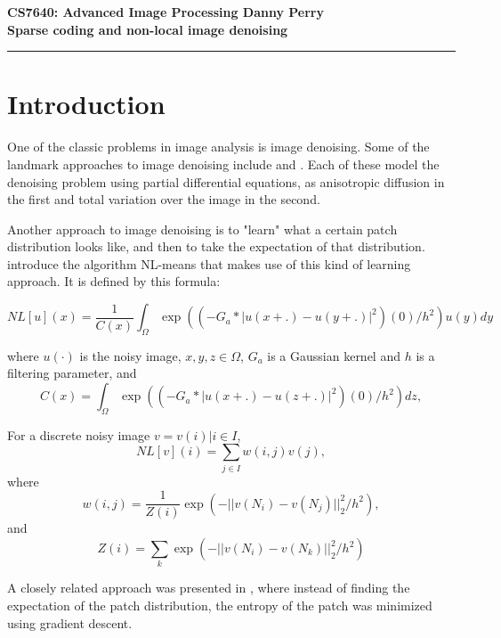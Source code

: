 \documentclass[11pt]{article}
\begin{document}
\thispagestyle{empty}
{\large{\bf CS7640: Advanced Image Processing \hfill Danny Perry}}\\

{\LARGE{\bf Sparse coding and non-local image denoising}}
\vspace{0.2\baselineskip}
\hrule

\section{Introduction}
One of the classic problems in image analysis is image denoising.
Some of the landmark approaches to image denoising include \cite{perona1990scale} and \cite{rudin1992nonlinear}.
Each of these model the denoising problem using partial differential equations, as anisotropic diffusion in the first and total variation over the image in the second. 

Another approach to image denoising is to "learn" what a certain patch distribution looks like, and then to take the expectation of that distribution.
\cite{buades2005non} introduce the algorithm NL-means that makes use of this kind of learning approach.
It is defined by this formula:

\begin{equation}
NL[u](x) = \frac{1}{C(x)} \int_{\Omega} \exp( (-G_a*|u(x+.)-u(y+.)|^2)(0) / h^2 ) u(y) dy
\end{equation}

where $u(\cdot)$ is the noisy image, $x,y,z\in \Omega$, $G_a$ is a Gaussian kernel and $h$ is a filtering parameter, and 
\begin{equation*}
C(x) = \int_{\Omega} \exp( (-G_a*|u(x+.)-u(z+.)|^2)(0) / h^2 ) dz,
\end{equation*}

For a discrete noisy image $v = {v(i) | i \in I}$,
\begin{equation}
NL[v](i) = \sum_{j \in I} w(i,j) v(j),
\end{equation}
where
\begin{equation*}
w(i,j) = \frac{1}{Z(i)} \exp( -||v(N_i)-v(N_j)||_2^2 / h^2 ),
\end{equation*}
and
\begin{equation*}
Z(i) = \sum_k \exp( -||v(N_i)-v(N_k)||_2^2 / h^2 )
\end{equation*}

A closely related approach was presented in \cite{awate2006unsupervised}, where instead of finding the expectation of the patch distribution, the entropy of the patch was minimized using gradient descent.
\end{document}
